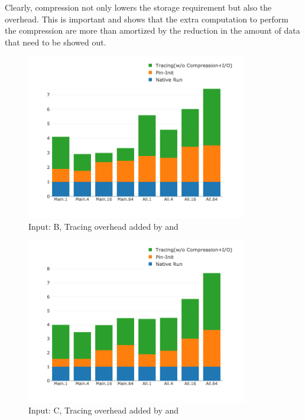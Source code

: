 Clearly, compression not only lowers the storage requirement but also the overhead. This is important and shows that the extra computation to perform the compression are more than amortized by the reduction in the amount of data that need to be showed out.



\begin{figure}[t]
\centering
\includegraphics[width=3.8in]{figs.comet.newMed/comet_chartDet_B_woc_byTool_p3_5.png}
\caption{ Input: B, Tracing overhead added by \pininit and \parlotnc
}
\label{comet_chartDet_B_woc_byTool_p3_5}
\end{figure}

\begin{figure}[t]
\centering
\includegraphics[width=3.8in]{figs.comet.newMed/comet_chartDet_C_woc_byTool_p3_5.png}
\caption{ Input: C, Tracing overhead added by \pininit and \parlotnc}
\label{comet_chartDet_C_woc_byTool_p3_5}
\end{figure}




